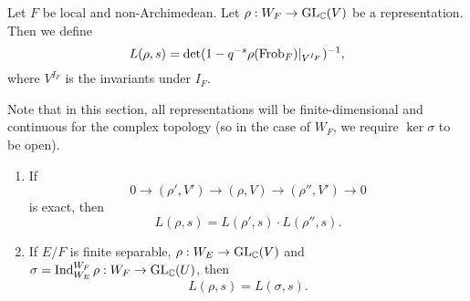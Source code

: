 \documentclass[a4paper]{article}
\begin{document}
\begin{defi}
  Let $F$ be local and non-Archimedean. Let $\rho: W_F \to \mathrm{GL}_{\mathbb{C}}(V)$ be a representation. Then we define
  \[
    L(\rho, s) = \det (1 - q^{-s} \rho(\mathrm{Frob}_F)|_{V^{I_F}})^{-1},
  \]
  where $V^{I_F}$ is the invariants under $I_F$.
\end{defi}
Note that in this section, all representations will be finite-dimensional and continuous for the complex topology (so in the case of $W_F$, we require $\ker \sigma$ to be open).

\begin{prop}\leavevmode
  \begin{enumerate}
    \item If
      \[
        0 \to (\rho', V') \to (\rho, V) \to (\rho'', V') \to 0
      \]
      is exact, then
      \[
        L(\rho, s) = L(\rho', s) \cdot L(\rho'', s).
      \]
    \item If $E/F$ is finite separable, $\rho: W_E \to \mathrm{GL}_{\mathbb{C}}(V)$ and $\sigma = \operatorname{Ind}_{W_E}^{W_F} \rho : W_F \to \mathrm{GL}_{\mathbb{C}}(U)$, then
      \[
        L(\rho, s) = L(\sigma, s).
      \]
  \end{enumerate}
\end{prop}
\end{document}
